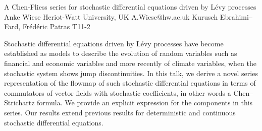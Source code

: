 \begin{talk}
  {A Chen-Fliess series for stochastic differential equations driven
by L{\'e}vy processes}%
  {Anke Wiese}%
  {Heriot-Watt University, UK}%
  {A.Wiese@hw.ac.uk}%
  {Kurusch Ebrahimi--Fard, Fr{\'e}d{\'e}ric Patras}%
  {T11-2}%

Stochastic differential equations driven by L{\'e}vy processes have become established as models to describe the evolution of random variables such as financial and economic variables and more recently of climate variables, when the stochastic system shows jump discontinuities. In this talk, we derive a novel series representation of the flowmap of such stochastic 
differential equations 
in terms of commutators of vector fields with stochastic 
coefficients, in other words a Chen--Strichartz formula. We provide an explicit expression for the components in this series. 
Our results extend previous results
for deterministic and continuous stochastic differential equations.		
\end{talk}

